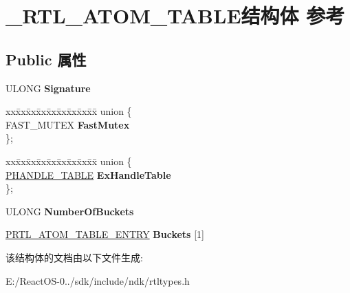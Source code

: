 \hypertarget{struct___r_t_l___a_t_o_m___t_a_b_l_e}{}\section{\+\_\+\+R\+T\+L\+\_\+\+A\+T\+O\+M\+\_\+\+T\+A\+B\+L\+E结构体 参考}
\label{struct___r_t_l___a_t_o_m___t_a_b_l_e}
\subsection*{Public 属性}
\begin{DoxyCompactItemize}
\item 
\mbox{\label{struct___r_t_l___a_t_o_m___t_a_b_l_e_ad1df843155fe61bfc1fdd9bd3285a20d}} 
U\+L\+O\+NG {\bfseries Signature}
\item 
\mbox{\label{struct___r_t_l___a_t_o_m___t_a_b_l_e_ad9d55ef999142d46f19fea6adedbed55}} 
\begin{tabbing}
xx\=xx\=xx\=xx\=xx\=xx\=xx\=xx\=xx\=\kill
union \{\\
\>FAST\_MUTEX {\bfseries FastMutex}\\
\}; \\

\end{tabbing}\item 
\mbox{\label{struct___r_t_l___a_t_o_m___t_a_b_l_e_afc49e4c6b723409b045a68d1e0a8a282}} 
\begin{tabbing}
xx\=xx\=xx\=xx\=xx\=xx\=xx\=xx\=xx\=\kill
union \{\\
\>\hyperlink{struct___h_a_n_d_l_e___t_a_b_l_e}{PHANDLE\_TABLE} {\bfseries ExHandleTable}\\
\}; \\

\end{tabbing}\item 
\mbox{\label{struct___r_t_l___a_t_o_m___t_a_b_l_e_a9e19bbcb8572fdeb183e3b116f5aa8ff}} 
U\+L\+O\+NG {\bfseries Number\+Of\+Buckets}
\item 
\mbox{\label{struct___r_t_l___a_t_o_m___t_a_b_l_e_a0f5e9a865a422f09f3d054b637820a45}} 
\hyperlink{struct___r_t_l___a_t_o_m___t_a_b_l_e___e_n_t_r_y}{P\+R\+T\+L\+\_\+\+A\+T\+O\+M\+\_\+\+T\+A\+B\+L\+E\+\_\+\+E\+N\+T\+RY} {\bfseries Buckets} \mbox{[}1\mbox{]}
\end{DoxyCompactItemize}


该结构体的文档由以下文件生成\+:\begin{DoxyCompactItemize}
\item 
E\+:/\+React\+O\+S-\/0../sdk/include/ndk/rtltypes.\+h\end{DoxyCompactItemize}
